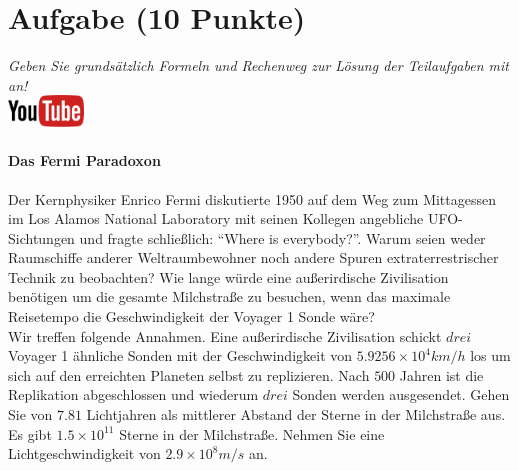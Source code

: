 \documentclass[a4paper, 9pt]{scrartcl}\usepackage[]{graphicx}\usepackage[]{xcolor}
\begin{document}
 
\clearpage

\section{Aufgabe \hfill (10 Punkte)}

\textit{Geben Sie grunds{\"a}tzlich Formeln und Rechenweg zur L{\"o}sung der
  Teilaufgaben mit an!} \\[1Ex]

\hfill\href{https://youtu.be/iCQogS6KhPM}{\includegraphics[width =
  2cm]{img/youtube}} %
\hspace{2Ex}

\paragraph{Das Fermi Paradoxon}



Der Kernphysiker Enrico Fermi diskutierte 1950 auf dem Weg zum Mittagessen
im Los Alamos National Laboratory mit seinen Kollegen angebliche
UFO-Sichtungen und fragte schlie{\ss}lich: "`Where is everybody?"'. Warum seien
weder Raumschiffe anderer Weltraumbewohner noch andere Spuren
extraterrestrischer Technik zu beobachten? Wie lange w{\"u}rde eine au{\ss}erirdische
Zivilisation ben{\"o}tigen um die gesamte Milchstra{\ss}e zu
besuchen, wenn das maximale Reisetempo die Geschwindigkeit der Voyager 1 Sonde w{\"a}re?\\[-1ex]

Wir treffen folgende Annahmen. Eine au{\ss}erirdische Zivilisation schickt $drei$
Voyager 1 {\"a}hnliche Sonden mit der Geschwindigkeit von $\ensuremath{5.9256\times 10^{4}}km/h$
los um sich auf den erreichten Planeten selbst zu replizieren. Nach
$500$ Jahren ist die Replikation abgeschlossen und wiederum
$drei$ Sonden werden ausgesendet. Gehen Sie von
$7.81$ Lichtjahren als mittlerer Abstand der Sterne in der
Milchstra{\ss}e aus. Es gibt $\ensuremath{1.5\times 10^{11}}$ Sterne in der Milchstra{\ss}e. Nehmen
Sie eine Lichtgeschwindigkeit von $\ensuremath{2.9\times 10^{8}}m/s$ an.
\end{document}
